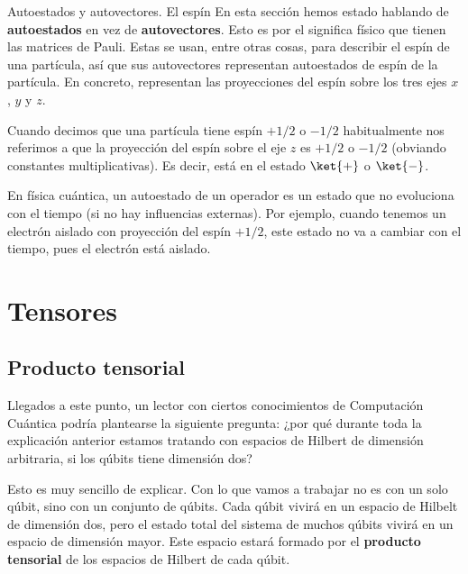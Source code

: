 \documentclass[a4paper,11pt]{book} %
\numberwithin{equation}{chapter}
\begin{document}
	\begin{mybox_blue}{Autoestados y autovectores. El espín}
	En esta sección hemos estado hablando de \textbf{autoestados} en vez de \textbf{autovectores}. Esto es 
	por el significa físico que tienen las matrices de Pauli. Estas se usan, entre otras cosas, para 
	describir el espín de una partícula, así que sus autovectores representan autoestados de espín de la partícula. 
	En concreto, representan las proyecciones del espín sobre los tres ejes $x$, $y$ y $z$. 	
	\vspace{0.3cm}

	Cuando decimos que una partícula tiene espín $+1/2$ o $-1/2$ habitualmente nos referimos a que la proyección
	del espín sobre el eje $z$ es $+1/2$ o $-1/2$ (obviando constantes multiplicativas). Es decir, está en el 
	estado $\ket{+}$ o $\ket{-}$.
	\vspace{0.3cm}
	
	En física cuántica, un autoestado de un operador es un estado que no evoluciona con el tiempo (si no hay influencias externas). 
	Por ejemplo, cuando tenemos un electrón aislado con proyección del espín $+1/2$, este estado no va a cambiar con el tiempo,
	pues el electrón está aislado. 
	\end{mybox_blue}




		
	
	\section{Tensores}
	
		\subsection{Producto tensorial}

Llegados a este punto, un lector con ciertos conocimientos de Computación Cuántica podría plantearse la siguiente pregunta: ¿por qué durante toda la explicación anterior estamos tratando con espacios de Hilbert de dimensión arbitraria, si los qúbits tiene dimensión dos? 

Esto es muy sencillo de explicar. Con lo que vamos a trabajar no es con un solo qúbit, sino con un conjunto de qúbits. Cada qúbit vivirá en un espacio de Hilbelt de dimensión dos, pero el estado total del sistema de muchos qúbits vivirá en un espacio de dimensión mayor. Este espacio estará formado por el \textbf{producto tensorial} de los espacios de Hilbert de cada qúbit.
\end{document}
